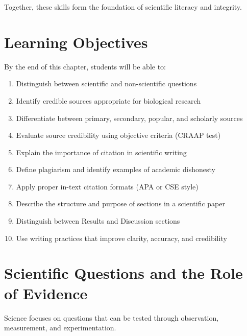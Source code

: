 \documentclass[
  letterpaper,
  DIV=11,
  numbers=noendperiod]{scrreprt}
\begin{document}
Together, these skills form the foundation of scientific literacy and
integrity.

\section*{\texorpdfstring{\textbf{Learning
Objectives}}{Learning Objectives}}\label{learning-objectives}


By the end of this chapter, students will be able to:

\begin{enumerate}
\def\labelenumi{\arabic{enumi}.}
\item
  Distinguish between scientific and non-scientific questions
\item
  Identify credible sources appropriate for biological research
\item
  Differentiate between primary, secondary, popular, and scholarly
  sources
\item
  Evaluate source credibility using objective criteria (CRAAP test)
\item
  Explain the importance of citation in scientific writing
\item
  Define plagiarism and identify examples of academic dishonesty
\item
  Apply proper in-text citation formats (APA or CSE style)
\item
  Describe the structure and purpose of sections in a scientific paper
\item
  Distinguish between Results and Discussion sections
\item
  Use writing practices that improve clarity, accuracy, and credibility
\end{enumerate}

\section*{\texorpdfstring{\textbf{Scientific Questions and the Role of
Evidence}}{Scientific Questions and the Role of Evidence}}\label{scientific-questions-and-the-role-of-evidence}


Science focuses on questions that can be tested through observation,
measurement, and experimentation.
\end{document}

